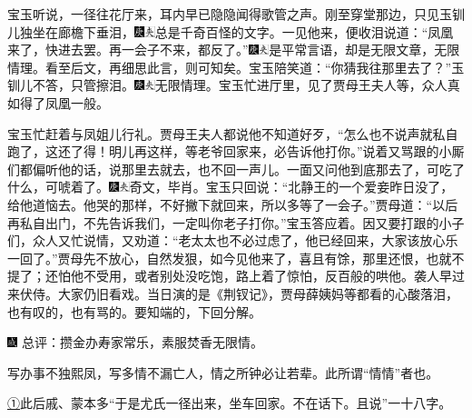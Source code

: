 宝玉听说，一径往花厅来，耳内早已隐隐闻得歌管之声。刚至穿堂那边，只见玉钏儿独坐在廊檐下垂泪，{\includegraphics[width=3mm]{../Images/00004}\includegraphics[width=3mm]{../Images/00012}\footnotesize \kaishu 总是千奇百怪的文字。}一见他来，便收泪说道：``凤凰来了，快进去罢。再一会子不来，都反了。''{\includegraphics[width=3mm]{../Images/00004}\includegraphics[width=3mm]{../Images/00012}\footnotesize \kaishu 是平常言语，却是无限文章，无限情理。看至后文，再细思此言，则可知矣。}宝玉陪笑道：``你猜我往那里去了？''玉钏儿不答，只管擦泪。{\includegraphics[width=3mm]{../Images/00004}\includegraphics[width=3mm]{../Images/00012}\footnotesize \kaishu 无限情理。}宝玉忙进厅里，见了贾母王夫人等，众人真如得了凤凰一般。

宝玉忙赶着与凤姐儿行礼。贾母王夫人都说他不知道好歹，``怎么也不说声就私自跑了，这还了得！明儿再这样，等老爷回家来，必告诉他打你。''说着又骂跟的小厮们都偏听他的话，说那里去就去，也不回一声儿。一面又问他到底那去了，可吃了什么，可唬着了。{\includegraphics[width=3mm]{../Images/00004}\includegraphics[width=3mm]{../Images/00012}\footnotesize \kaishu 奇文，毕肖。}宝玉只回说：``北静王的一个爱妾昨日没了，给他道恼去。他哭的那样，不好撇下就回来，所以多等了一会子。''贾母道：``以后再私自出门，不先告诉我们，一定叫你老子打你。''宝玉答应着。因又要打跟的小子们，众人又忙说情，又劝道：``老太太也不必过虑了，他已经回来，大家该放心乐一回了。''贾母先不放心，自然发狠，如今见他来了，喜且有馀，那里还恨，也就不提了；还怕他不受用，或者别处没吃饱，路上着了惊怕，反百般的哄他。袭人早过来伏侍。大家仍旧看戏。当日演的是《荆钗记》，贾母薛姨妈等都看的心酸落泪，也有叹的，也有骂的。要知端的，下回分解。

{\includegraphics[width=3mm]{../Images/00005} \kaishu 总评：攒金办寿家常乐，素服焚香无限情。}

{写办事不独熙凤，写多情不漏亡人，情之所钟必让若辈。此所谓``情情''者也。}

{\href{../Text/part0047_split_000.html\#navto_1_a}{①}此后戚、蒙本多``于是尤氏一径出来，坐车回家。不在话下。且说''一十八字。}
